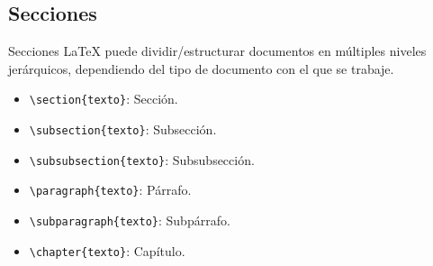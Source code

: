\documentclass[12pt]{beamer}
\begin{document}
\subsection{Secciones}
\begin{frame}{Secciones}
  LaTeX puede dividir/estructurar documentos en múltiples niveles jerárquicos, dependiendo del tipo de documento con el que se trabaje.
  \begin{itemize}
    \item<1-> {\color{blue}\texttt{\textbackslash section\{texto\}}}: Secci\'on.
    \item<2-> {\color{blue}\texttt{\textbackslash subsection\{texto\}}}: Subsecci\'on.
    \item<3-> {\color{blue}\texttt{\textbackslash subsubsection\{texto\}}}: Subsubsecci\'on.
    \item <4-> {\color{blue}\texttt{\textbackslash paragraph\{texto\}}}: Párrafo.
    \item <5-> {\color{blue}\texttt{\textbackslash subparagraph\{texto\}}}: Subpárrafo.
    \item <6-> {\color{blue}\texttt{\textbackslash chapter\{texto\}}}: Cap\'itulo.
  \end{itemize}
\end{frame}
\end{document}
